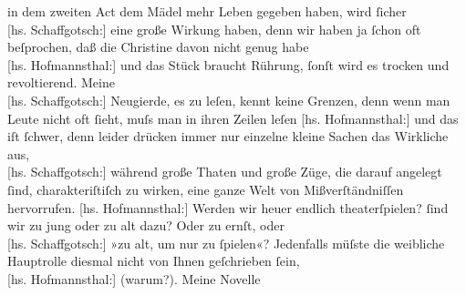 \begin{ledgroupsized}[t]{13cm}
                    in dem zweiten Act dem Mädel mehr Leben gegeben
                    haben, wird ſicher {\\}{[}hs. Schaffgotsch:{]} eine große Wirkung haben, denn
                    wir haben ja ſchon oft beſprochen, daß die Christine davon nicht genug habe {\\}{[}hs. Hofmannsthal:{]} und das Stück braucht Rührung, ſonſt wird es trocken und revoltierend. Meine
                        {\\}{[}hs. Schaffgotsch:{]} Neugierde, es zu leſen, kennt keine Grenzen,
                    denn wenn man Leute nicht oft ſieht, muſs man in ihren Zeilen leſen \pend
           \pstart
           {\pb}{[}hs. Hofmannsthal:{]} und das iſt ſchwer, denn leider drücken immer nur
                    einzelne kleine Sachen das Wirkliche aus, {\\}{[}hs. Schaffgotsch:{]} während
                    große Thaten und große Züge, die darauf angelegt ſind, charakteriſtiſch zu
                    wirken, eine ganze Welt von Mißverſtändniſſen hervorrufen.\pend
           \pstart
           {[}hs. Hofmannsthal:{]} Werden wir heuer endlich theaterſpielen? { }ſind wir zu jung oder zu alt dazu? Oder zu ernſt,
                    oder {\\}{[}hs. Schaffgotsch:{]} »zu alt, um nur zu ſpielen«? Jedenfalls müſste
                    die weibliche Hauptrolle diesmal nicht von Ihnen geſchrieben ſein, {\\}{[}hs. Hofmannsthal:{]} (warum?). Meine Novelle

\end{ledgroupsized}

